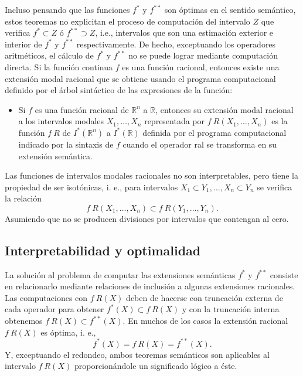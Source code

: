 Incluso pensando que las funciones $f^*$ y $f^{**}$ son óptimas en el sentido semántico, estos teoremas no explicitan el proceso de computación del intervalo $Z$ que verifica $f^* \subset Z$ ó $f^{**} \supset Z$, i.e., intervalos que son una estimación exterior e interior de $f^*$ y $f^{**}$ respectivamente. De hecho, exceptuando los operadores aritméticos, el cálculo de $f^*$ y $f^{**}$  no se puede lograr mediante computación directa. Si la función continua $f$ es una función racional, entonces existe  una extensión modal racional que se obtiene usando el programa computacional definido por el árbol sintáctico de las expresiones de la función:

\begin{itemize}
\item Si $f$ es una función racional de $\mathbb{R}^n$ a $\mathbb{R}$, entonces su extensión modal racional a los intervalos modales $X_1, \dotso, X_n$ representada por $f \ R(X_1, \dotso, X_n)$ es la función $f \ R$ de $I^*(\mathbb{R}^n)$ a $I^*(\mathbb{R})$ definida por el programa computacional indicado por la sintaxis de $f$ cuando el operador ral se transforma en su extensión semántica.
\end{itemize}

Las funciones de intervalos modales racionales no son interpretables, pero tiene la propiedad de ser isotónicas, i. e., para intervalos $X_1 \subset Y_1, \dotso, X_n \subset Y_n$ se verifica la relación
\begin{equation}
f \ R(X_1, \dotso, X_n) \subset f \ R(Y_1, \dotso, Y_n).
\nonumber
\end{equation}
Asumiendo que no se producen divisiones por intervalos que contengan al cero.

\subsection{Interpretabilidad y optimalidad}

La solución al problema de computar las extensiones semánticas $f^*$ y $f^{**}$ consiste en relacionarlo mediante relaciones de inclusión a algunas extensiones racionales. Las computaciones con $f \ R(X)$ deben de hacerse con truncación externa de cada operador para obtener $f^*(X) \subset f \ R(X)$ y con la truncación interna obtenemos $f \ R(X) \subset f^{**}(X)$. En muchos de los casos la extensión racional $f \ R(X)$ es óptima, i. e.,
\begin{equation}
f^*(X) = f \ R(X) = f^{**}(X).
\nonumber
\end{equation}
Y, exceptuando el redondeo, ambos teoremas semánticos son aplicables al intervalo $f \ R(X)$ proporcionándole un significado lógico a éste.

